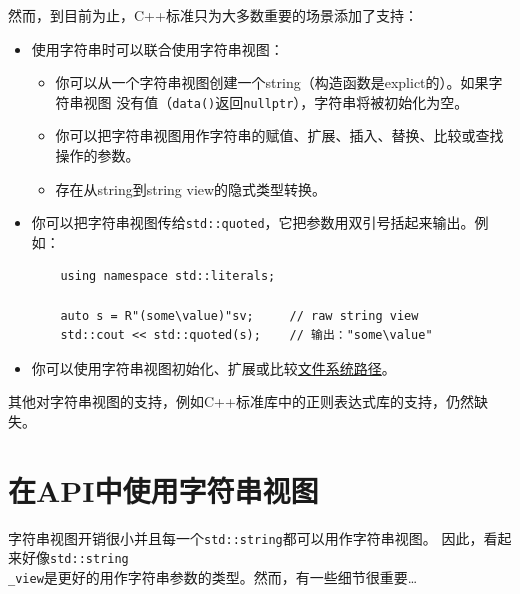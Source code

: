 然而，到目前为止，C++标准只为大多数重要的场景添加了支持：
\begin{itemize}
    \item 使用字符串时可以联合使用字符串视图：
    \begin{itemize}
        \item 你可以从一个字符串视图创建一个string（构造函数是explict的）。如果字符串视图
        没有值（\texttt{data()}返回\texttt{nullptr}），字符串将被初始化为空。
        \item 你可以把字符串视图用作字符串的赋值、扩展、插入、替换、比较或查找操作的参数。
        \item 存在从string到string view的隐式类型转换。
    \end{itemize}
    \item 你可以把字符串视图传给\texttt{std::quoted}，它把参数用双引号括起来输出。例如：
    \begin{lstlisting}
    using namespace std::literals;

    auto s = R"(some\value)"sv;     // raw string view
    std::cout << std::quoted(s);    // 输出："some\value"
    \end{lstlisting}
    \item 你可以使用字符串视图初始化、扩展或比较\hyperref[ch20.2.3]{文件系统路径}。
\end{itemize}
其他对字符串视图的支持，例如C++标准库中的正则表达式库的支持，仍然缺失。


\section{在API中使用字符串视图}
字符串视图开销很小并且每一个\texttt{std::string}都可以用作字符串视图。
因此，看起来好像\texttt{std::string\\
\_view}是更好的用作字符串参数的类型。然而，有一些细节很重要\ldots

